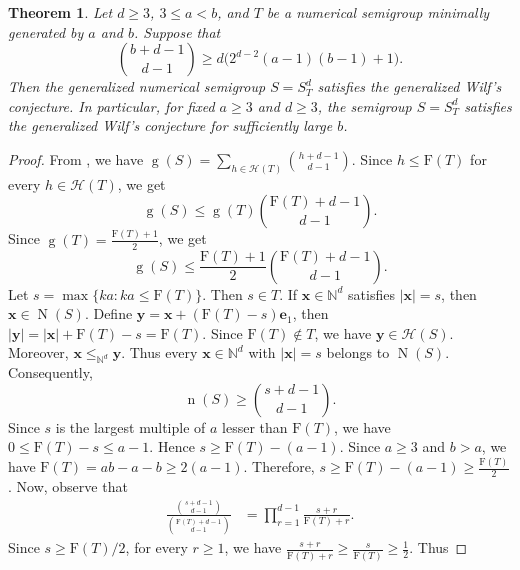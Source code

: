 \documentclass[12pt]{amsart}
\theoremstyle{plain}
\theoremstyle{theorem}
\newtheorem{theorem}[definition]{Theorem}
\theoremstyle{remark}
\begin{document}
\begin{theorem}\label{thm:graded-d}
	Let $d\geq 3$, $3\leq a<b$, and $T$ be a numerical semigroup minimally generated by $a$ and $b$. Suppose that
	\[
	\binom{b+d-1}{d-1}
	\geq
	d\bigl(2^{d-2}(a-1)(b-1) +1\bigr).
	\]
	Then the generalized numerical semigroup $S = S_T^d	$ satisfies the generalized Wilf's conjecture. In particular, for fixed $a \geq 3$ and $d \geq 3$, the semigroup $S = S_T^d	$ satisfies the generalized Wilf's conjecture for sufficiently large $b$. 
\end{theorem}

\begin{proof}
	From \cite[Remark~4.2]{Cisto-Navarra}, we have $\operatorname{g}(S)	= \sum_{h\in \mathcal{H}(T)} \binom{h+d-1}{d-1}.$ Since $h\leq \mathrm{F}(T)$ for every $h\in \mathcal{H}(T)$, we get \[ \operatorname{g}(S) \leq \operatorname{g}(T) \binom{\mathrm{F}(T)+d-1}{d-1}.\]
	Since $\operatorname{g}(T) = 	\frac{\mathrm{F}(T)+1}{2}$, we get
	\begin{equation}\label{eq:1}
		\operatorname{g}(S) \leq \frac{\mathrm{F}(T)+1}{2}\binom{\mathrm{F}(T)+d-1}{d-1}.
\tag{1}
	\end{equation}
Let $s=\max\{ka:ka\leq \mathrm{F}(T)\}$. Then $s\in T$. If $\mathbf{x}\in \mathbb{N}^d$ satisfies $|\mathbf{x}|=s$, then $\mathbf{x}\in \operatorname{N}(S)$. Define $\mathbf{y}=\mathbf{x}+(\mathrm{F}(T)-s)\mathbf{e}_1$,	then $|\mathbf{y}| =|\mathbf{x}|+\mathrm{F}(T)-s = \mathrm{F}(T)$. Since $\mathrm{F}(T) \notin T$, we have $\mathbf{y}\in \mathcal{H}(S)$. Moreover, $\mathbf{x}\leq_{\mathbb{N}^d} \mathbf{y}$. Thus every $\mathbf{x}\in\mathbb{N}^d$ with $|\mathbf{x}|=s$ belongs to $\operatorname{N}(S)$. Consequently,
	\begin{equation}\label{eq:2}
		\operatorname{n}(S) \geq \binom{s+d-1}{d-1}. \tag{2}
	\end{equation}
Since $s$ is the largest multiple of $a$ lesser than $\mathrm{F}(T)$, we have	$0\leq \mathrm{F}(T)-s\leq a-1$. Hence $s\geq \mathrm{F}(T)-(a-1)$. Since $a\geq 3$ and $b>a$, we have $\mathrm{F}(T)=ab-a-b\geq 2(a-1)$. Therefore, $s\geq \mathrm{F}(T)-(a-1)\geq \frac{\mathrm{F}(T)}{2}$. Now, observe that
	\begin{align*}
		\frac{
			\binom{s+d-1}{d-1}
		}{
			\binom{\mathrm{F}(T)+d-1}{d-1}
		}
		&=
		\prod_{r=1}^{d-1}
		\frac{s+r}{\mathrm{F}(T)+r}.
	\end{align*}
	Since $s\geq \mathrm{F}(T)/2$, for every $r\geq1$, we have $	\frac{s+r}{\mathrm{F}(T)+r} \geq \frac{s}{\mathrm{F}(T)} \geq \frac{1}{2}$.
	Thus

\end{proof}
\end{document}
